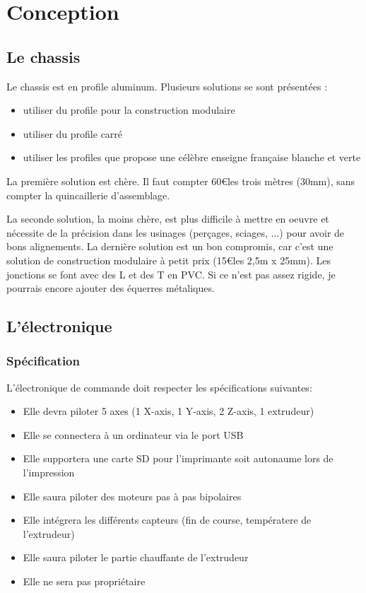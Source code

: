\section{Conception}
\subsection{Le chassis}
Le chassis est en profile aluminum. Plusieurs solutions se sont %
présentées :\begin{itemize}%
\item{utiliser du profile pour la construction modulaire}%
\item{utiliser du profile carré}%
\item{utiliser les profiles que propose une célèbre enseigne française %
blanche et verte}
\end{itemize}%
La première solution est chère. Il faut compter 60\euro les trois mètres %
(30mm), sans compter la quincaillerie d'assemblage. \par%
La seconde solution, la moins chère, est plus difficile à mettre en %
oeuvre et nécessite de la précision dans les usinages (perçages, sciages, %
...) pour avoir de bons alignements.%
La dernière solution est un bon compromis, car c'est une solution de %
construction modulaire à petit prix (15\euro les 2,5m x 25mm). Les jonctions %
se font avec des L et des T en PVC. Si ce n'est pas assez rigide, je %
pourrais encore ajouter des équerres métaliques.
\subsection{L'électronique}
\subsubsection{Spécification}
L'électronique de commande doit respecter les spécifications suivantes: %
\begin{itemize}%
\item{Elle devra piloter 5 axes (1 X-axis, 1 Y-axis, 2 Z-axis, 1 extrudeur)} %
\item{Elle se connectera à un ordinateur via le port USB} %
\item{Elle supportera une carte SD pour l'imprimante soit autonaume lors de %
l'impression} %
\item{Elle saura piloter des moteurs pas à pas bipolaires}
\item{Elle intégrera les différents capteurs (fin de course, températere de %
l'extrudeur)}
\item{Elle saura piloter le partie chauffante de l'extrudeur} %
\item{Elle ne sera pas propriétaire} %
\end{itemize} %
